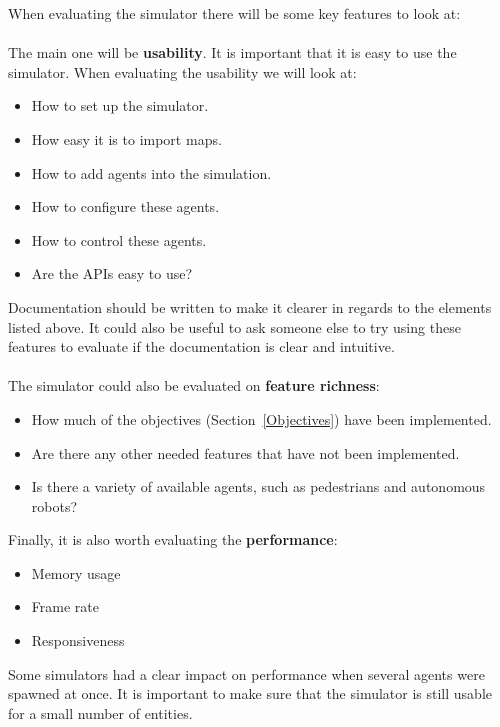 When evaluating the simulator there will be some key features to look at:
\\~\\
The main one will be \textbf{usability}. It is important that it is easy to use the simulator. When evaluating the usability we will look at:
\begin{itemize}
    \item How to set up the simulator.
    \item How easy it is to import maps.
    \item How to add agents into the simulation.
    \item How to configure these agents.
    \item How to control these agents.
    \item Are the APIs easy to use?
\end{itemize}
Documentation should be written to make it clearer in regards to the elements listed above. It could also be useful to ask someone else to try using these features to evaluate if the documentation is clear and intuitive. 
\\~\\
The simulator could also be evaluated on \textbf{feature richness}:
\begin{itemize}
    \item How much of the objectives (Section~\ref{Objectives}) have been implemented.
    \item Are there any other needed features that have not been implemented.
    \item Is there a variety of available agents, such as pedestrians and autonomous robots?
\end{itemize}

Finally, it is also worth evaluating the \textbf{performance}:
\begin{itemize}
    \item Memory usage
    \item Frame rate
    \item Responsiveness
\end{itemize}
Some simulators had a clear impact on performance when several agents were spawned at once. It is important to make sure that the simulator is still usable for a small number of entities. 

